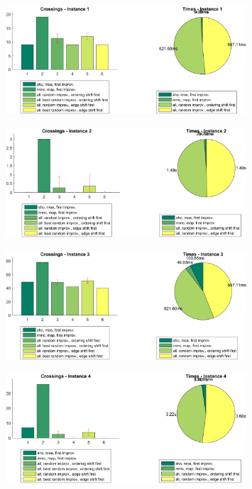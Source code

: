 \documentclass[11pt]{article}
\begin{document}
\newpage

\begin{figure}[h]
\centering
\includegraphics[width=0.8\textwidth]{instance1}
\end{figure}

\begin{figure}[h]
\centering
\includegraphics[width=0.8\textwidth]{instance2}
\end{figure}

\begin{figure}[h]
\centering
\includegraphics[width=0.8\textwidth]{instance3}
\end{figure}

\begin{figure}[h]
\centering
\includegraphics[width=0.8\textwidth]{instance4}
\end{figure}
\end{document}
